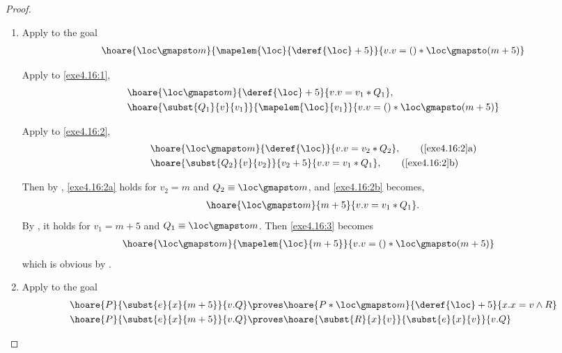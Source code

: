 \begin{proof}
  \begin{enumerate}
    \item \label{exe4.16.1}
      Apply  to the goal
      \begin{align}
        \hoare{\loc \gmapsto m}{\mapelem{\loc}{\deref{\loc} + 5}}
        {v.v = () * \loc \gmapsto (m + 5)} \label{exe4.16:1}
      \end{align}

      Apply  to \eqref{exe4.16:1},
      \begin{align}
        & \hoare{\loc \gmapsto m}{\deref{\loc} + 5}{v.v = v_1 * Q_1},
        \label{exe4.16:2} \\
        & \hoare{\subst{Q_1}{v}{v_1}}{\mapelem{\loc}{v_1}}
        {v.v = () * \loc \gmapsto (m + 5)} \label{exe4.16:3}
      \end{align}

      Apply  to \eqref{exe4.16:2},
      \begin{align}
        & \hoare{\loc \gmapsto m}{\deref{\loc}}{v.v = v_2 * Q_2},
        \tag{\ref{exe4.16:2}a} \label{exe4.16:2a} \\
        & \hoare{\subst{Q_2}{v}{v_2}}{v_2 + 5}{v.v = v_1 * Q_1},
        \tag{\ref{exe4.16:2}b} \label{exe4.16:2b}
      \end{align}

      Then by , \eqref{exe4.16:2a} holds for
      $v_2 = m$ and $Q_2 \equiv \loc \gmapsto m$, and \eqref{exe4.16:2b}
      becomes,
      \begin{align*}
        \hoare{\loc \gmapsto m}{m + 5}{v.v = v_1 * Q_1}.
      \end{align*}
      By , it holds for $v_1 = m + 5$ and $Q_1 \equiv
      \loc \gmapsto m$. Then \eqref{exe4.16:3} becomes
      \begin{align*}
        & \hoare{\loc \gmapsto m}{\mapelem{\loc}{m + 5}}
        {v.v = () * \loc \gmapsto (m + 5)}
      \end{align*}
      which is obvious by .

    \item Apply  to the goal
      \begin{align}
        \hoare{P}{\subst{e}{x}{m + 5}}{v.Q} \proves &
        \hoare{P * \loc \gmapsto m}{\deref{\loc} + 5}{x.x = v \wedge R}
        \label{exe4.16:4} \\
        \hoare{P}{\subst{e}{x}{m + 5}}{v.Q} \proves &
        \hoare{\subst{R}{x}{v}}{\subst{e}{x}{v}}{v.Q}
        \label{exe4.16:5}
      \end{align}


\end{enumerate}
\end{proof}
